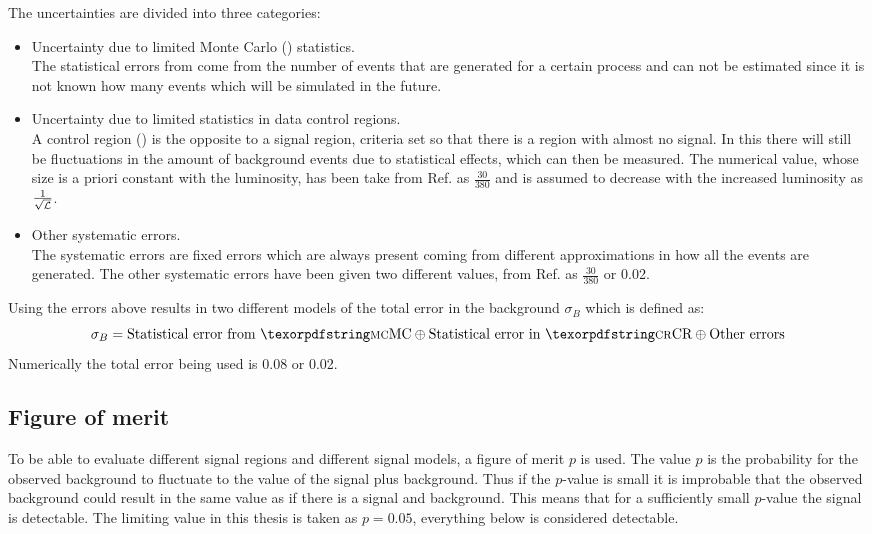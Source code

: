 The uncertainties are divided into three categories:
\begin{itemize}
\item Uncertainty due to limited Monte Carlo (\abbrMC) statistics. \\
The statistical errors from \abbrMC come from the number of events that are generated for a certain process and can not be estimated since it is not known how many events which will be simulated in the future.

\item Uncertainty due to limited statistics in data control regions.\\
A control region (\abbrCR) is the opposite to a signal region,  criteria set so that there is a region with almost no signal. In this \abbrCR there will still be fluctuations in the amount of background events due to statistical effects, which can then be measured. The numerical value, whose size is a priori constant with the luminosity, has been take from Ref. \citep{ATLAS-CONF-2012-147} as $\frac{30}{380}$ and is assumed to decrease with the increased luminosity as $\frac{1}{\sqrt{\mathcal{L}}}$.

\item Other systematic errors.\\
The systematic errors are fixed errors which are always present coming from different approximations in how all the events are generated. The other systematic errors have been given two different values, from Ref. \citep{ATLAS-CONF-2012-147} as $\frac{30}{380}$ or 0.02.
\end{itemize}

Using the errors above results in two different models of the total error in the background $\sigma_B$ which is defined as:
\begin{equation*}
\sigma_B = \text{Statistical error from \abbrMC} \oplus \text{Statistical error in \abbrCR} \oplus \text{Other errors}
\end{equation*}
Numerically the total error being used is 0.08 or 0.02. 

\subsection{Figure of merit}\label{subsec:figmer}
To be able to evaluate different signal regions and different signal models, a figure of merit $p$ is used. The value $p$ is the probability for the observed background to fluctuate to the value of the signal plus background. Thus if the $p$-value is small it is improbable that the observed background could result in the same value as if there is a signal and background. This means that for a sufficiently small $p$-value the signal is detectable. The limiting value in this thesis is taken as $p=0.05$, everything below is considered detectable. 


